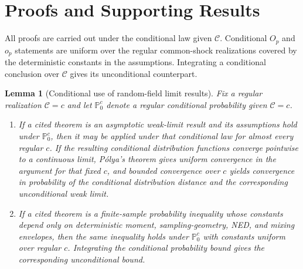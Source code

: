 \documentclass[11pt]{article}
\numberwithin{equation}{section}
\newtheorem{lemma}{Lemma}
\theoremstyle{remark}
\newcommand{\Pzero}{\mathbb P_0}
\begin{document}
\clearpage
\appendix


\section{Proofs and Supporting Results}
\label{app:proofs}

All proofs are carried out under the conditional law given $\mathscr C$. Conditional $O_p$ and $o_p$ statements are uniform over the regular common-shock realizations covered by the deterministic constants in the assumptions. Integrating a conditional conclusion over $\mathscr C$ gives its unconditional counterpart.

\begin{lemma}[Conditional use of random-field limit results]
\label{lem:conditional_limit_transfer}
Fix a regular realization $\mathscr C=c$ and let $\Pzero^c$ denote a regular conditional probability given $\mathscr C=c$.
\begin{enumerate}[label=(\roman*),leftmargin=2em]
\item If a cited theorem is an asymptotic weak-limit result and its assumptions hold under $\Pzero^c$, then it may be applied under that conditional law for almost every regular $c$. If the resulting conditional distribution functions converge pointwise to a continuous limit, Pólya's theorem gives uniform convergence in the argument for that fixed $c$, and bounded convergence over $c$ yields convergence in probability of the conditional distribution distance and the corresponding unconditional weak limit.
\item If a cited theorem is a finite-sample probability inequality whose constants depend only on deterministic moment, sampling-geometry, NED, and mixing envelopes, then the same inequality holds under $\Pzero^c$ with constants uniform over regular $c$. Integrating the conditional probability bound gives the corresponding unconditional bound.
\end{enumerate}
\end{lemma}
\end{document}

